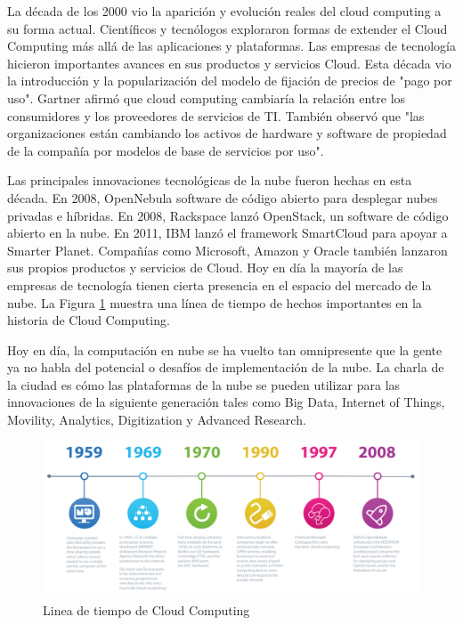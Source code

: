 \documentclass[a4paper, 12pt]{report}
\begin{document}
\begin{justify}
La década de los 2000 vio la aparición y evolución reales del cloud computing a su forma actual. Científicos y tecnólogos exploraron formas de extender el Cloud Computing más allá de las aplicaciones y plataformas. Las empresas de tecnología hicieron importantes avances en sus productos y servicios Cloud. Esta década vio la introducción y la popularización del modelo de fijación de precios de "pago por uso". Gartner afirmó que cloud computing cambiaría la relación entre los consumidores y los proveedores de servicios de TI. También observó que "las organizaciones están cambiando los activos de hardware y software de propiedad de la compañía por modelos de base de servicios por uso".

Las principales innovaciones tecnológicas de la nube fueron hechas en esta década. En 2008, OpenNebula software de código abierto para desplegar nubes privadas e híbridas. En 2008, Rackspace lanzó OpenStack, un software de código abierto en la nube. En 2011, IBM lanzó el framework SmartCloud para apoyar a Smarter Planet. Compañías como Microsoft, Amazon y Oracle también lanzaron sus propios productos y servicios de Cloud. Hoy en día la mayoría de las empresas de tecnología tienen cierta presencia en el espacio del mercado de la nube. La Figura \ref{fig:lineacloud} muestra una línea de tiempo de hechos importantes en la historia de Cloud Computing.

Hoy en día, la computación en nube se ha vuelto tan omnipresente que la gente ya no habla del potencial o desafíos de implementación de la nube. La charla de la ciudad es cómo las plataformas de la nube se pueden utilizar para las innovaciones de la siguiente generación tales como Big Data, Internet of Things, Movility, Analytics, Digitization y Advanced Research.
\end{justify}
\begin{figure}[ht]
	\begin{center}
		\includegraphics[width=1\textwidth]{lineacloud}
		\caption{Linea de tiempo de Cloud Computing}
		\label{fig:lineacloud}
	\end{center}
\end{figure}
\end{document}
